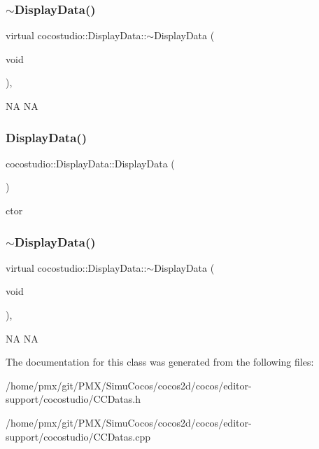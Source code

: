 \subsubsection{\texorpdfstring{$\sim$\+Display\+Data()}{~DisplayData()}\hspace{0.1cm}{\footnotesize\ttfamily [1/2]}}
{\footnotesize\ttfamily virtual cocostudio\+::\+Display\+Data\+::$\sim$\+Display\+Data (\begin{DoxyParamCaption}\item[{void}]{ }\end{DoxyParamCaption})\hspace{0.3cm}{\ttfamily [inline]}, {\ttfamily [virtual]}}

NA  NA \mbox{\label{classcocostudio_1_1DisplayData_ab126e08794f485181ead1f8cf40f5a7d}} 
\subsubsection{\texorpdfstring{Display\+Data()}{DisplayData()}\hspace{0.1cm}{\footnotesize\ttfamily [2/2]}}
{\footnotesize\ttfamily cocostudio\+::\+Display\+Data\+::\+Display\+Data (\begin{DoxyParamCaption}{ }\end{DoxyParamCaption})}

ctor \mbox{\label{classcocostudio_1_1DisplayData_ad5ac2420f0ca264f9a341b7c682dca93}} 
\subsubsection{\texorpdfstring{$\sim$\+Display\+Data()}{~DisplayData()}\hspace{0.1cm}{\footnotesize\ttfamily [2/2]}}
{\footnotesize\ttfamily virtual cocostudio\+::\+Display\+Data\+::$\sim$\+Display\+Data (\begin{DoxyParamCaption}\item[{void}]{ }\end{DoxyParamCaption})\hspace{0.3cm}{\ttfamily [inline]}, {\ttfamily [virtual]}}

NA  NA 

The documentation for this class was generated from the following files\+:\begin{DoxyCompactItemize}
\item 
/home/pmx/git/\+P\+M\+X/\+Simu\+Cocos/cocos2d/cocos/editor-\/support/cocostudio/C\+C\+Datas.\+h\item 
/home/pmx/git/\+P\+M\+X/\+Simu\+Cocos/cocos2d/cocos/editor-\/support/cocostudio/C\+C\+Datas.\+cpp\end{DoxyCompactItemize}
